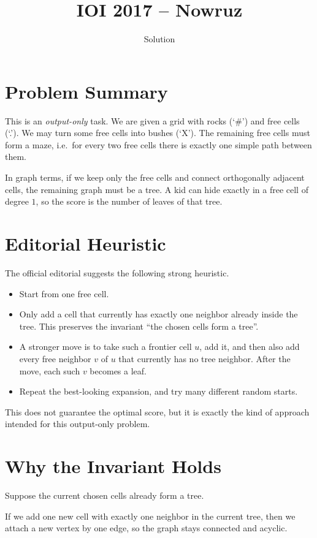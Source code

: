 \documentclass[11pt,a4paper]{article}
\title{IOI 2017 -- Nowruz}
\author{Solution}
\date{}
\begin{document}
\maketitle

\section{Problem Summary}
This is an \emph{output-only} task.
We are given a grid with rocks (`\#') and free cells (`.').
We may turn some free cells into bushes (`X').
The remaining free cells must form a maze, i.e.\ for every two free cells there is exactly one simple
path between them.

In graph terms, if we keep only the free cells and connect orthogonally adjacent cells, the remaining
graph must be a tree.
A kid can hide exactly in a free cell of degree $1$, so the score is the number of leaves of that tree.

\section{Editorial Heuristic}
The official editorial suggests the following strong heuristic.

\begin{itemize}
  \item Start from one free cell.
  \item Only add a cell that currently has exactly one neighbor already inside the tree.
        This preserves the invariant ``the chosen cells form a tree''.
  \item A stronger move is to take such a frontier cell $u$, add it, and then also add every free
        neighbor $v$ of $u$ that currently has no tree neighbor.
        After the move, each such $v$ becomes a leaf.
  \item Repeat the best-looking expansion, and try many different random starts.
\end{itemize}

This does not guarantee the optimal score, but it is exactly the kind of approach intended for this
output-only problem.

\section{Why the Invariant Holds}
Suppose the current chosen cells already form a tree.

If we add one new cell with exactly one neighbor in the current tree, then we attach a new vertex by
one edge, so the graph stays connected and acyclic.
\end{document}
